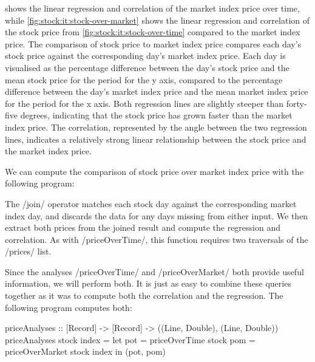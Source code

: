 

 shows the linear regression and correlation of the market index price over time, while \cref{fig:stock:it:stock-over-market} shows the linear regression and correlation of the stock price from \cref{fig:stock:it:stock-over-time} compared to the market index price.
The comparison of stock price to market index price compares each day's stock price against the corresponding day's market index price.
Each day is visualised as the percentage difference between the day's stock price and the mean stock price for the period for the y axis, compared to the percentage difference between the day's market index price and the mean market index price for the period for the x axis.
Both regression lines are slightly steeper than forty-five degrees, indicating that the stock price has grown faster than the market index price.
The correlation, represented by the angle between the two regression lines, indicates a relatively strong linear relationship between the stock price and the market index price.

We can compute the comparison of stock price over market index price with the following program:


The \Hs/join/ operator matches each stock day against the corresponding market index day, and discards the data for any days missing from either input.
We then extract both prices from the joined result and compute the regression and correlation.
As with \Hs/priceOverTime/, this function requires two traversals of the \Hs/prices/ list.

Since the analyses \Hs/priceOverTime/ and \Hs/priceOverMarket/ both provide useful information, we will perform both.
It is just as easy to combine these queries together as it was to compute both the correlation and the regression.
The following program computes both:

\begin{haskell}
priceAnalyses :: [Record] -> [Record] -> ((Line, Double), (Line, Double))
priceAnalyses stock index =
  let pot = priceOverTime   stock
      pom = priceOverMarket stock index
  in (pot, pom)
\end{haskell}

